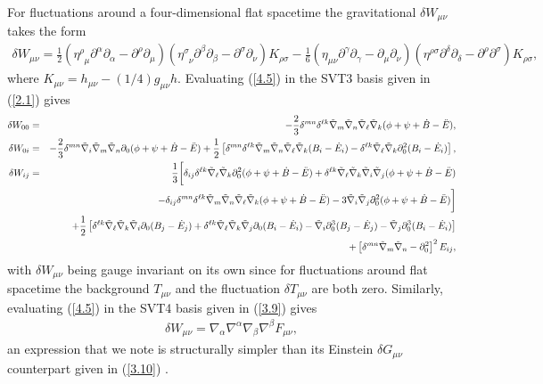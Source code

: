 \documentclass[aps,onecolumn,10pt]{revtex4}
\numberwithin{equation}{section}
\numberwithin{equation}{section}
\begin{document}
For fluctuations around a four-dimensional flat spacetime the gravitational $\delta W_{\mu\nu}$  takes the form \cite{Mannheim2006}
%
\begin{eqnarray}
\delta W_{\mu\nu}=\frac{1}{2}(\eta^{\rho}_{\phantom{\rho} \mu} \partial^{\alpha}\partial_{\alpha}-\partial^{\rho}\partial_{\mu})
(\eta^{\sigma}_{\phantom{\sigma} \nu} \partial^{\beta}\partial_{\beta}-
\partial^{\sigma}\partial_{\nu})K_{\rho \sigma}- 
\frac{1}{6}(\eta_{\mu \nu} \partial^{\gamma}\partial_{\gamma}-
\partial_{\mu}\partial_{\nu})(\eta^{\rho \sigma} \partial^{\delta}\partial_{\delta}-
\partial^{\rho}\partial^{\sigma})K_{\rho\sigma},
\label{4.5}
\end{eqnarray}
%
where $K_{\mu\nu}=h_{\mu\nu}-(1/4)g_{\mu\nu}h$. Evaluating (\ref{4.5}) in the SVT3 basis given in (\ref{2.1}) gives \cite{Amarasinghe2018}
%
\begin{eqnarray}
\delta W_{00}  &=& -\frac{2}{3} \delta^{mn}\delta^{\ell k}\tilde{\nabla}_m\tilde{\nabla}_n\tilde{\nabla}_{\ell}\tilde{\nabla}_k (\phi + \psi +\dot{B}-\ddot{E}),
\nonumber\\	
\delta W_{0i} &=&  -\frac{2}{3} \delta^{mn}\tilde{\nabla}_i\tilde{\nabla}_m\tilde{\nabla}_n\partial_0(\phi +\psi +\dot{B}-\ddot{E})
	+\frac{1}{2}\left[\delta^{mn}\delta^{\ell k}\tilde{\nabla}_m\tilde{\nabla}_n\tilde{\nabla}_{\ell}\tilde{\nabla}_k(B_i - \dot{E}_i) -  \delta^{\ell k}\tilde{\nabla}_{\ell}\tilde{\nabla}_k \partial_0^2(B_i - \dot{E}_i)\right],
\nonumber\\	
\delta W_{ij}  &=& \frac{1}{3}\bigg{[} \delta_{ij}\delta^{\ell k}\tilde{\nabla}_{\ell}\tilde{\nabla}_k  \partial_0^2(\phi+ \psi+\dot{B}-\ddot{E}) + \delta^{\ell k}\tilde{\nabla}_{\ell}\tilde{\nabla}_k \tilde{\nabla}_i\tilde{\nabla}_j (\phi + \psi +\dot{B}-\ddot{E}) 
\nonumber\\
&&- \delta_{ij} \delta^{mn}\delta^{\ell k}\tilde{\nabla}_m\tilde{\nabla}_n\tilde{\nabla}_{\ell}\tilde{\nabla}_k(\phi + \psi +\dot{B}-\ddot{E}) -3\tilde{\nabla}_i\tilde{\nabla}_j \partial_0^2(\phi + \psi +\dot{B}-\ddot{E})\bigg{] }
\nonumber\\
&&+\frac{1}{2}\left[ \delta^{\ell k}\tilde{\nabla}_{\ell}\tilde{\nabla}_k \tilde{\nabla}_i   \partial_0(B_j - \dot{E}_j)+ \delta^{\ell k}\tilde{\nabla}_{\ell}\tilde{\nabla}_k \tilde{\nabla}_j \partial_0(B_i - \dot{E}_i) - \tilde{\nabla}_i\partial_0^3(B_j - \dot{E}_j)-\tilde{\nabla}_j\partial_0^3(B_i - \dot{E}_i)\right]
\nonumber\\
&&+\left[\delta^{mn}\tilde{\nabla}_m\tilde{\nabla}_n-\partial_0^2\right]^2E_{ij},
\label{4.6}
\end{eqnarray}
%
with $\delta W_{\mu\nu}$ being gauge invariant on its own since for fluctuations around flat spacetime the background $T_{\mu\nu}$ and the fluctuation $\delta T_{\mu\nu}$ are both zero.
Similarly,  evaluating (\ref{4.5}) in the SVT4 basis given in (\ref{3.9}) gives 
%
\begin{eqnarray}
\delta W_{\mu\nu}=\nabla_{\alpha}\nabla^{\alpha}\nabla_{\beta}\nabla^{\beta}F_{\mu\nu},
\label{4.7}
\end{eqnarray}
%
an expression that we note is structurally  simpler than its Einstein $\delta G_{\mu\nu}$ counterpart given  in (\ref{3.10}) \cite{footnote6}. 
\end{document}
